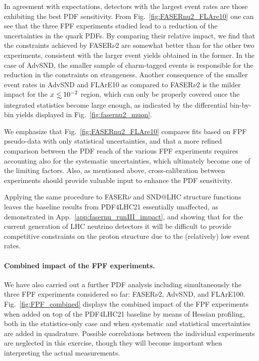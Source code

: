 In agreement with expectations, 
detectors with the largest event rates are those exhibiting the
best PDF sensitivity.
%
From Fig.~\ref{fig:FASERnu2_FLAre10} one can see that the three
FPF experiments studied lead to a reduction of the  uncertainties in the quark PDFs.
%
By comparing their relative impact, we find that the constraints
achieved by FASER$\nu$2 are somewhat better than for the other two experiments,
consistent with the larger event yields obtained in the former.
%
In the case of AdvSND, the  smaller sample of charm-tagged events is responsible for the reduction
in the constraints on strangeness.
%
Another consequence of the smaller event rates in AdvSND and FLArE10 as compared
to FASER$\nu$2 is the milder impact for the $x\lsim 10^{-2}$ region,
which can only be properly covered once the integrated statistics become large
enough,  as indicated by the differential bin-by-bin yields displayed in Fig.~\ref{fig:fasernu2_muon}.

We emphasize
that Fig.~\ref{fig:FASERnu2_FLAre10} compares fits based on FPF pseudo-data
with only statistical uncertainties, and that a more refined comparison between the PDF reach of
the various FPF experiments requires accounting also for the systematic uncertainties, which ultimately become
one of the limiting factors.
%
Also, as mentioned above, cross-calibration between experiments should provide
valuable input to enhance the PDF sensitivity.

Applying the same procedure to FASER$\nu$ and SND@LHC structure
functions leaves the baseline  results from PDF4LHC21 essentially
unaffected, as demonstrated in App.~\ref{app:fasernu_runIII_impact},
and showing that for the current generation of LHC neutrino detectors
it will be difficult to provide competitive constraints on the proton structure due
to the (relatively) low event rates.

\paragraph{Combined impact of the FPF experiments.}
%
We have also carried out a further PDF analysis including simultaneously the three FPF experiments
considered so far: FASER$\nu$2, AdvSND, and FLArE100.
%
Fig.~\ref{fig:FPF_combined} displays the combined impact of the FPF experiments when added
on top of the  PDF4LHC21 baseline by means of Hessian profiling, both in the statistics-only case and
when systematic and statistical uncertainties are added in quadrature.
%
Possible correlations between the individual experiments are neglected in this exercise, though they
will become important when interpreting the actual measurements.


